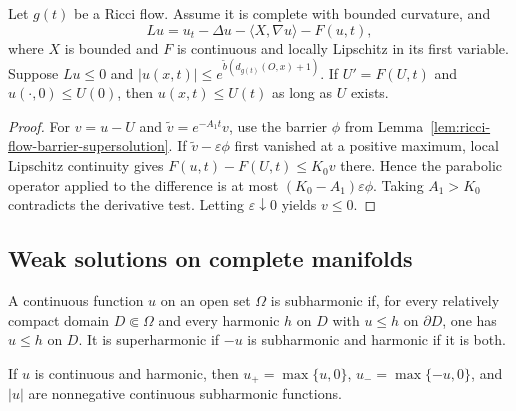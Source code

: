 \begin{theorem}
\label{thm:noncompact-scalar-pde-ode-comparison}
Let $g(t)$ be a Ricci flow.  Assume it is complete with bounded curvature, and
\[
Lu=u_t-\Delta u-\langle X,\nabla u\rangle-F(u,t),
\]
where $X$ is bounded and $F$ is continuous and locally Lipschitz in its first
variable.  Suppose $Lu\leq0$ and
$|u(x,t)|\leq e^{\widetilde b(d_{g(t)}(O,x)+1)}$.  If $U'=F(U,t)$ and
$u(\cdot,0)\leq U(0)$, then $u(x,t)\leq U(t)$ as long as $U$ exists.
\end{theorem}

\begin{proof}
\sketch
{}
For $v=u-U$ and $\widetilde v=e^{-A_1t}v$, use the barrier $\phi$ from
Lemma~\ref{lem:ricci-flow-barrier-supersolution}.  If
$\widetilde v-\varepsilon\phi$ first vanished at a positive maximum, local
Lipschitz continuity gives $F(u,t)-F(U,t)\leq K_0v$ there.  Hence the
parabolic operator applied to the difference is at most
$(K_0-A_1)\varepsilon\phi$.  Taking $A_1>K_0$ contradicts the derivative
test.  Letting $\varepsilon\downarrow0$ yields $v\leq0$.
\end{proof}

\subsection{Weak solutions on complete manifolds}

\begin{definition}
\label{def:continuous-subharmonic-function}
A continuous function $u$ on an open set $\Omega$ is subharmonic if, for every
relatively compact domain $D\Subset\Omega$ and every harmonic $h$ on $D$ with
$u\leq h$ on $\partial D$, one has $u\leq h$ on $D$.  It is superharmonic if
$-u$ is subharmonic and harmonic if it is both.
\end{definition}

\begin{lemma}
\label{lem:absolute-value-harmonic-subsolution}
If $u$ is continuous and harmonic, then $u_+=\max\{u,0\}$,
$u_-=\max\{-u,0\}$, and $|u|$ are nonnegative continuous subharmonic
functions.
\end{lemma}

